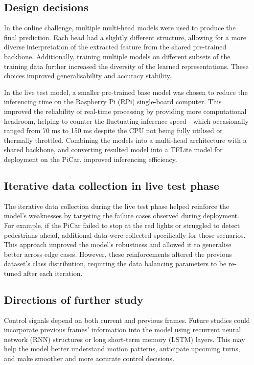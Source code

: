 \documentclass{article}
\begin{document}
\subsection{Design decisions}
In the online challenge, multiple multi-head models were used to produce the final prediction. Each head had a slightly different structure, allowing for a more diverse interpretation of the extracted feature from the shared pre-trained backbone. Additionally, training multiple models on different subsets of the training data further increased the diversity of the learned representations. These choices improved generalisability and accuracy stability.

In the live test model, a smaller pre-trained base model was chosen to reduce the inferencing time on the Raspberry Pi (RPi) single-board computer. This improved the reliability of real-time processing by providing more computational headroom, helping to counter the fluctuating inference speed - which occasionally ranged from 70 ms to 150 ms despite the CPU not being fully utilised or thermally throttled. Combining the models into a multi-head architecture with a shared backbone, and converting resulted model into a TFLite model for deployment on the PiCar, improved inferencing efficiency.

\subsection{Iterative data collection in live test phase}
The iterative data collection during the live test phase helped reinforce the model's weaknesses by targeting the failure cases observed during deployment. For example, if the PiCar failed to stop at the red lights or struggled to detect pedestrians ahead, additional data were collected specifically for those scenarios. This approach improved the model's robustness and allowed it to generalise better across edge cases. However, these reinforcements altered the previous dataset's class distribution, requiring the data balancing parameters to be re-tuned after each iteration.

\subsection{Directions of further study}
Control signals depend on both current and previous frames. Future studies could incorporate previous frames' information into the model using recurrent neural network (RNN) structures or long short-term memory (LSTM) layers. This may help the model better understand motion patterns, anticipate upcoming turns, and make smoother and more accurate control decisions.
\end{document}
